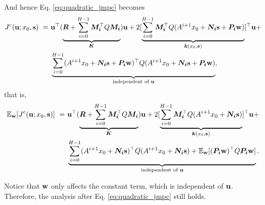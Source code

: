 And hence Eq. \ref{eq:quadratic_jmpc} becomes
\begin{align}
J^{\mathrm{c}}(\bold{u}; x_0, \bold{s}) ~=~ &  \bold{u}^\top (\underbrace{\bm{R} + \sum_{i=0}^{H-1} \bm{M_{i}}^\top Q \bm{M_{i}}}_{\bm{K}}) \bold{u} + 2[\underbrace{\sum_{i=0}^{H-1} \bm{M_{i}}^\top Q (A^{i+1} x_0 + \bm{N_{i}} \bold{s} + \bm{P_i} \bold{w})}_{\bm{k}(x_0, \bold{s})}]^\top \bold{u} + \\
& \underbrace{\sum_{i=0}^{H-1} (A^{i+1} x_0 + \bm{N_{i}} \bold{s} + \bm{P_i} \bold{w})^\top Q (A^{i+1} x_0 + \bm{N_{i}} \bold{s} + \bm{P_i} \bold{w})}_{\text{independent of $\bold{u}$}},
\end{align}
that is,
\begin{align}
\mathbb{E}_{\bold{w}}[J^{\mathrm{c}}(\bold{u}; x_0, \bold{s})] ~=~ &  \bold{u}^\top (\underbrace{\bm{R} + \sum_{i=0}^{H-1} \bm{M_{i}}^\top Q \bm{M_{i}}}_{\bm{K}}) \bold{u} + 2[\underbrace{\sum_{i=0}^{H-1} \bm{M_{i}}^\top Q (A^{i+1} x_0 + \bm{N_{i}} \bold{s})}_{\bm{k}(x_0, \bold{s})}]^\top \bold{u} + \\
& \underbrace{\sum_{i=0}^{H-1} (A^{i+1} x_0 + \bm{N_{i}} \bold{s})^\top Q (A^{i+1} x_0 +\bm{N_{i}} \bold{s}) + \mathbb{E}_{\bold{w}}[(\bm{P_i} \bold{w})^\top Q \bm{P_i} \bold{w}] }_{\text{independent of $\bold{u}$}}.
\end{align}

Notice that $\bold{w}$ only affects the constant term, which is independent of $\bold{u}$. Therefore, the analysis after Eq. \ref{eq:quadratic_jmpc} still holds.






